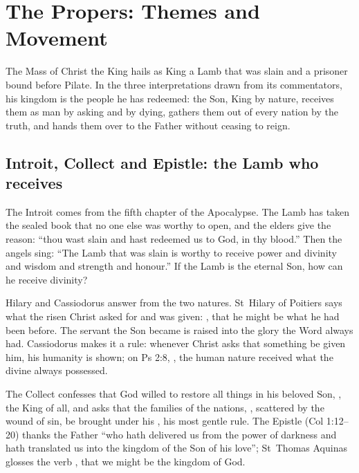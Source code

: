 
\section{The Propers: Themes and Movement}

The Mass of Christ the King hails as King a Lamb that was slain and a prisoner
bound before Pilate. In the three interpretations drawn from its commentators, his
kingdom is the people he has redeemed: the Son, King by nature, receives them
as man by asking and by dying, gathers them out of every nation by the truth,
and hands them over to the Father without ceasing to reign.

\subsection{Introit, Collect and Epistle: the Lamb who receives}

The Introit comes from the fifth chapter of the Apocalypse. The Lamb has taken
the sealed book that no one else was worthy to open, and the elders give the
reason: ``thou wast slain and hast redeemed us to God, in thy blood.'' Then
the angels sing: ``The Lamb that was slain
is worthy to receive power and divinity and wisdom and strength and honour.''
If the Lamb is the eternal Son, how can he receive divinity?

Hilary and Cassiodorus answer from the two natures. St~Hilary of Poitiers says what
the risen Christ asked for and was given: ,
that he might be what he had been before. The servant the Son became is
raised into the glory the Word always had. Cassiodorus makes it a rule:
whenever Christ asks that something be given him, his humanity is shown; on Ps 2:8,
, the human
nature received what the divine always possessed.

The Collect confesses that God willed to restore all things in his beloved
Son, , the King of all, and asks that the families of
the nations, , scattered by the wound of
sin, be brought under his , his most gentle
rule. The Epistle (Col 1:12--20) thanks the Father ``who hath
delivered us from the power of darkness and hath translated us into the
kingdom of the Son of his love''; St~Thomas Aquinas glosses the verb
, that we might be the kingdom of God.


